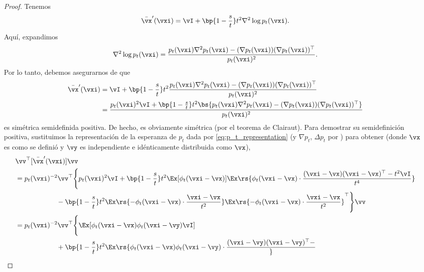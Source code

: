 \documentclass[../../book-main_es.tex]{subfiles}
\begin{document}
\begin{proof}
    Tenemos
    \begin{equation}
        \bar{\vx}^{\prime}(\vxi) = \vI + \bp{1 -
        \frac{s}{t}}t^{2}\nabla^{2}\log p_{t}(\vxi).
    \end{equation}
    Aquí, expandimos
    \begin{equation}
        \nabla^{2}\log p_{t}(\vxi) =
        \frac{p_{t}(\vxi)\nabla^{2}p_{t}(\vxi) - (\nabla
        p_{t}(\vxi))(\nabla p_{t}(\vxi))^{\top}}{p_{t}(\vxi)^{2}}.
    \end{equation}
    Por lo tanto, debemos asegurarnos de que
    \begin{align}
        \bar{\vx}^{\prime}(\vxi)
        &= \vI + \bp{1 -
        \frac{s}{t}}t^{2}\frac{p_{t}(\vxi)\nabla^{2}p_{t}(\vxi) -
        (\nabla p_{t}(\vxi))(\nabla p_{t}(\vxi))^{\top}}{p_{t}(\vxi)^{2}} \\
        &= \frac{p_{t}(\vxi)^{2}\vI + \bp{1 -
            \frac{s}{t}}t^{2}\bs{p_{t}(\vxi)\nabla^{2}p_{t}(\vxi) -
        (\nabla p_{t}(\vxi))(\nabla p_{t}(\vxi))^{\top}}}{p_{t}(\vxi)^{2}}
    \end{align}
    es simétrica semidefinida positiva. De hecho, es obviamente
    simétrica (por el teorema de Clairaut). Para demostrar su
    semidefinición positiva, sustituimos la representación de la esperanza de
    \(p_{t}\) dada por \eqref{eq:p_t_representation} (y \(\nabla
    p_{t}\), \(\Delta p_{t}\) por ) para
    obtener (donde \(\vx\) es como se definió y \(\vy\) es independiente e idénticamente distribuida como \(\vx\)),
    \begin{align}
        &\vv^{\top}[\bar{\vx}^{\prime}(\vxi)]\vv \\
        &= p_{t}(\vxi)^{-2}\vv^{\top}\Bigg\{p_{t}(\vxi)^{2}\vI +
            \bp{1 - \frac{s}{t}}t^{2}\Ex[\phi_{t}(\vxi -
            \vx)]\Ex\rs{\phi_{t}(\vxi - \vx)\cdot\frac{(\vxi -
            \vx)(\vxi - \vx)^{\top} - t^{2}\vI}{t^{4}}} \\
            & \qquad \qquad \qquad -\bp{1 -
            \frac{s}{t}}t^{2}\Ex\rs{-\phi_{t}(\vxi - \vx)\cdot\frac{\vxi
            - \vx}{t^{2}}}\Ex\rs{-\phi_{t}(\vxi - \vx)\cdot\frac{\vxi -
        \vx}{t^{2}}}^{\top}\Bigg\}\vv \\
        &= p_{t}(\vxi)^{-2}\vv^{\top}\Bigg\{\Ex[\phi_{t}(\vxi -
            \vx)\phi_{t}(\vxi - \vy)\vI] \\
            & \qquad \qquad \qquad + \bp{1 -
            \frac{s}{t}}t^{2}\Ex\rs{\phi_{t}(\vxi - \vx)\phi_{t}(\vxi
                - \vy)\cdot\frac{(\vxi - \vy)(\vxi - \vy)^{\top} -
}}
\end{align}
\end{proof}
\end{document}
